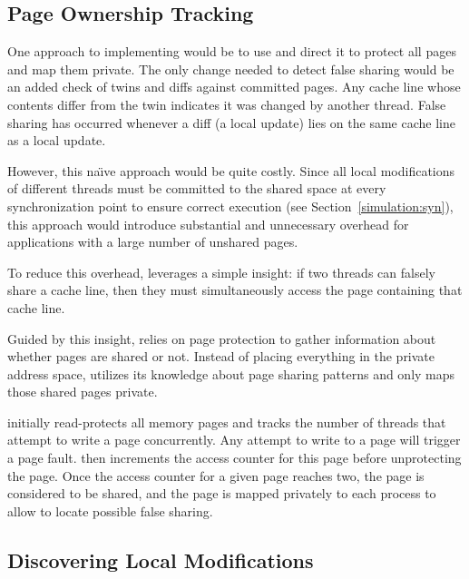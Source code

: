 \subsection{Page Ownership Tracking}
\label{falseshare:basic mechanism}

One approach to implementing \sheriffdetect{} would be to use \sheriff{} and direct it to 
protect all pages and map them private.
The only change needed to detect false sharing would be an added check of twins
and diffs against committed pages. Any cache line whose contents
differ from the twin indicates it was changed by another thread. False sharing
has occurred whenever a diff (a
local update) lies on the same cache line as a local update.

However, this na\"{\i}ve approach would be quite costly. Since all local
modifications of different threads must be committed to the shared
space at every synchronization point to ensure correct
execution (see Section~\ref{simulation:syn}), this approach would
introduce substantial and unnecessary overhead for applications with a
large number of unshared pages.

To reduce this overhead, \sheriffdetect{} leverages a simple insight:
if two threads can falsely share a cache line, then
they must simultaneously access the page containing that
cache line.

Guided by this insight, \sheriffdetect{} relies on page protection to
gather information about whether pages are shared or not.
Instead of placing everything in the private address space,
\sheriffdetect{} utilizes its knowledge about page sharing patterns and
only maps those shared pages private.

\sheriffdetect{} initially read-protects all memory pages
and tracks the number of threads that attempt to write a page concurrently.
Any attempt to write to a
page will trigger a page fault.
\sheriffdetect{} then
increments the access counter for this page before unprotecting the page.
Once the access counter for a given page reaches two,
the page is considered to be shared,
and the page is mapped privately to each process to allow \sheriffdetect{} to locate possible false sharing.


\subsection{Discovering Local Modifications}
\label{falseshare:memorywrites}

